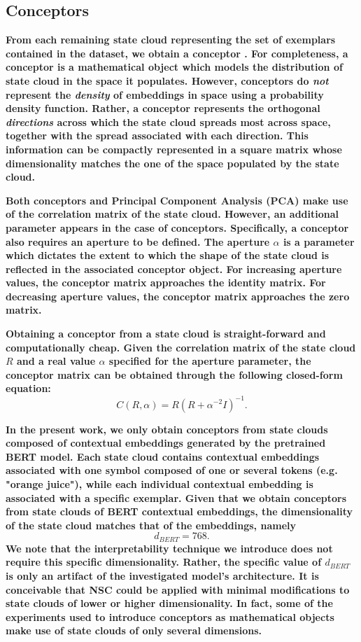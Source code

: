 \subsection{Conceptors}

\textbf{From each remaining state cloud representing the set of exemplars contained in the dataset, we obtain a conceptor \citep{jaeger_controlling_2017}. For completeness, a conceptor is a mathematical object which models the distribution of state cloud in the space it populates. However, conceptors do \textit{not} represent the \textit{density} of embeddings in space using a probability density function. Rather, a conceptor represents the orthogonal \textit{directions} across which the state cloud spreads most across space, together with the spread associated with each direction. This information can be compactly represented in a square matrix whose dimensionality matches the one of the space populated by the state cloud.}

\textbf{Both conceptors and Principal Component Analysis (PCA) make use of the correlation matrix of the state cloud. However, an additional parameter appears in the case of conceptors. Specifically, a conceptor also requires an aperture to be defined. The aperture $\alpha$ is a parameter which dictates the extent to which the shape of the state cloud is reflected in the associated conceptor object. For increasing aperture values, the conceptor matrix approaches the identity matrix. For decreasing aperture values, the conceptor matrix approaches the zero matrix.}

\textbf{Obtaining a conceptor from a state cloud is straight-forward and computationally cheap. Given the correlation matrix of the state cloud $R$ and a real value $\alpha$ specified for the aperture parameter, the conceptor matrix can be obtained through the following closed-form equation:$$C(R, \alpha) = R (R + \alpha^{-2} I)^{-1}.$$}

\textbf{In the present work, we only obtain conceptors from state clouds composed of contextual embeddings generated by the pretrained BERT model. Each state cloud contains contextual embeddings associated with one symbol composed of one or several tokens (e.g. "orange juice"), while each individual contextual embedding is associated with a specific exemplar. Given that we obtain conceptors from state clouds of BERT contextual embeddings, the dimensionality of the state cloud matches that of the embeddings, namely $$d_{BERT}=768.$$ We note that the interpretability technique we introduce does not require this specific dimensionality. Rather, the specific value of $d_{BERT}$ is only an artifact of the investigated model's architecture. It is conceivable that NSC could be applied with minimal modifications to state clouds of lower or higher dimensionality. In fact, some of the experiments used to introduce conceptors as mathematical objects make use of state clouds of only several dimensions.}

